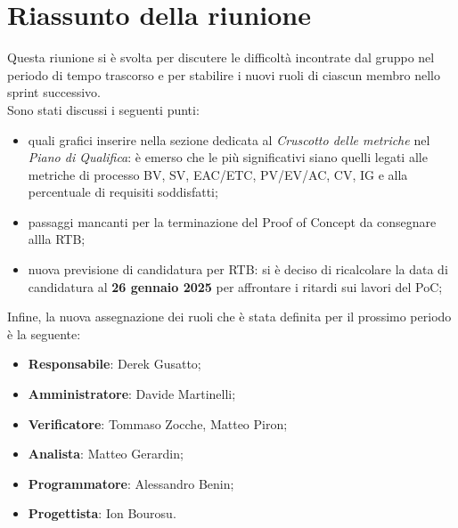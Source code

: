 \section{Riassunto della riunione}
Questa riunione si è svolta per discutere le difficoltà incontrate dal gruppo nel periodo di tempo trascorso e per stabilire i nuovi ruoli di ciascun membro nello sprint successivo.\\
Sono stati discussi i seguenti punti:
\begin{itemize}
    \item quali grafici inserire nella sezione dedicata al \textit{Cruscotto delle metriche} nel \textit{Piano di Qualifica}: è emerso che le più significativi siano quelli legati alle metriche di processo BV, SV, EAC/ETC, PV/EV/AC, CV, IG e alla percentuale di requisiti soddisfatti;
    \item passaggi mancanti per la terminazione del Proof of Concept da consegnare allla RTB;
    \item nuova previsione di candidatura per RTB: si è deciso di ricalcolare la data di candidatura al \textbf{26 gennaio 2025} per affrontare i ritardi sui lavori del PoC;
\end{itemize}
Infine, la nuova assegnazione dei ruoli che è stata definita per il prossimo periodo è la seguente:
 \begin{itemize}
    \item \textbf{Responsabile}: Derek Gusatto;
    \item \textbf{Amministratore}: Davide Martinelli;
    \item \textbf{Verificatore}: Tommaso Zocche, Matteo Piron;
    \item \textbf{Analista}: Matteo Gerardin;
    \item \textbf{Programmatore}: Alessandro Benin;
    \item \textbf{Progettista}: Ion Bourosu.
\end{itemize}